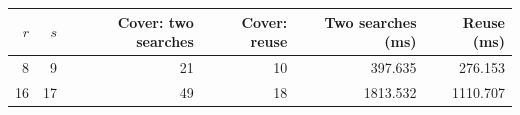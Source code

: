 \begin{tabular}{@{}rrrrrr@{}}
\toprule
$r$ & $s$ & Cover: two searches & Cover: reuse & Two searches (ms) & Reuse (ms)\\
\midrule
8 & 9 & 21 & 10 & 397.635 & 276.153\\
16 & 17 & 49 & 18 & 1813.532 & 1110.707\\
\bottomrule
\end{tabular}

